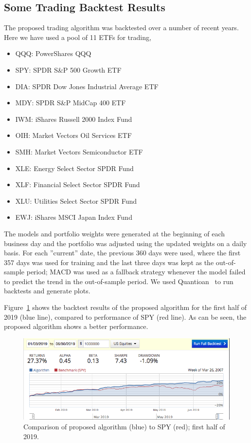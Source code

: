 \documentclass{article}
\begin{document}
\begin{case}
\subsection{Some Trading Backtest Results}\label{subsection:trading-backtest}

The proposed trading algorithm was backtested over a number of recent
years. Here we have used a pool of 11 ETFs for trading,

\begin{itemize}
    \item[] QQQ: PowerShares QQQ 
    \item[] SPY: SPDR S\&P 500 Growth ETF 
    \item[] DIA: SPDR Dow Jones Industrial Average ETF 
    \item[] MDY: SPDR S\&P MidCap 400 ETF 
    \item[] IWM: iShares Russell 2000 Index Fund 
    \item[] OIH: Market Vectors Oil Services ETF 
    \item[] SMH: Market Vectors Semiconductor ETF 
    \item[] XLE: Energy Select Sector SPDR Fund 
    \item[] XLF: Financial Select Sector SPDR Fund 
    \item[] XLU: Utilities Select Sector SPDR Fund 
    \item[] EWJ: iShares MSCI Japan Index Fund
\end{itemize}

The models and portfolio weights were generated at the beginning of
each business day and the portfolio was adjusted using the updated
weights on a daily basis. For each ''current'' date, the previous 360
days were used, where the first 357 days was used for training and the
last three days was kept as the out-of-sample period; MACD was used as
a fallback strategy whenever the model failed to predict the trend in
the out-of-sample period. We used Quantioan~\cite{ref:quantopian} to
run backtests and generate plots.

Figure~\ref{fig:backtest-2019-half} shows the backtest results of the
proposed algorithm for the first half of 2019 (blue line), compared to
performance of SPY (red line). As can be seen, the proposed algorithm
shows a better performance.

\begin{figure}\label{fig:backtest-2019-half}
\includegraphics[bb=0 0 640 480]{figures/2019_half_mfd_macd.png}
\caption{Comparison of proposed algorithm (blue) to SPY (red); first half of 2019.}  
\end{figure}


\end{case}
\end{document}
